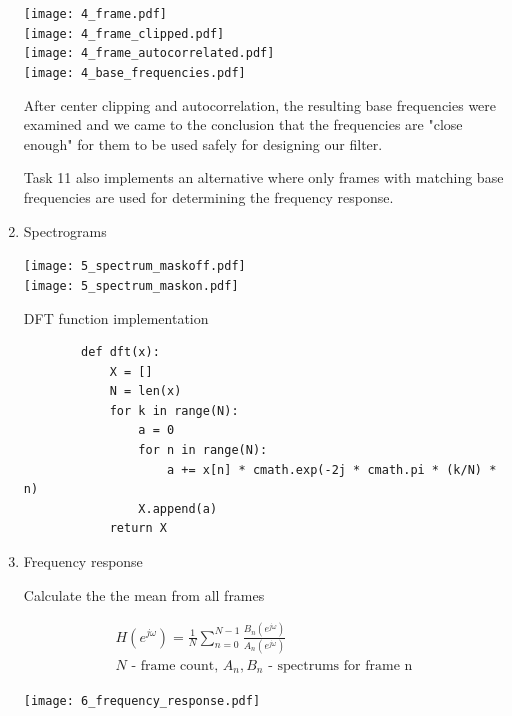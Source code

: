 \documentclass[a4paper, 11pt]{article}
\begin{document}
\begin{enumerate}
        \newpage
        \texttt{[image: 4\_frame.pdf]} \\
        \texttt{[image: 4\_frame\_clipped.pdf]} \\
        \texttt{[image: 4\_frame\_autocorrelated.pdf]} \\
        \texttt{[image: 4\_base\_frequencies.pdf]}

        After center clipping and autocorrelation, the resulting base frequencies were examined
        and we came to the conclusion that the frequencies are "close enough"
        for them to be used safely for designing our filter.

        Task 11 also implements an alternative where only frames with matching base frequencies are used for
        determining the frequency response.

        \newpage
        \item
        Spectrograms

        \texttt{[image: 5\_spectrum\_maskoff.pdf]} \\
        \texttt{[image: 5\_spectrum\_maskon.pdf]}

        \newpage

        DFT function implementation

        \begin{verbatim}
        def dft(x):
            X = []
            N = len(x)
            for k in range(N):
                a = 0
                for n in range(N):
                    a += x[n] * cmath.exp(-2j * cmath.pi * (k/N) * n)
                X.append(a)
            return X
        \end{verbatim}

        \item
        Frequency response

        Calculate the the mean from all frames

        \begin{gather*}
            H(e^{j\omega}) = \frac{1}{N} \sum_{n=0}^{N-1} \frac{ B_n(e^{j\omega}) }{ A_n(e^{j\omega}) } \\
            N \text{ - frame count, } A_n, B_n \text{ - spectrums for frame n}
        \end{gather*}

        \texttt{[image: 6\_frequency\_response.pdf]}


\end{enumerate}
\end{document}

